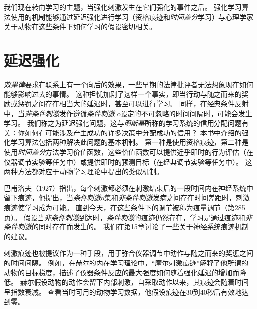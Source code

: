 我们现在转向学习的主题，当强化刺激发生在它们强化的事件之后。
强化学习算法使用的机制能够通过延迟强化进行学习（资格痕迹和\textit{时间差分}学习）与心理学家关于动物在这些条件下如何学习的假设密切相关。


\section{延迟强化} \label{sec:delayed_reinforcement}


\textit{效果律}要求在联系上有一个向后的效果，一些早期的法律批评者无法想象现在如何能够影响过去的事情。
这种担忧加剧了这样一个事实，即当行动与随之而来的奖励或惩罚之间存在相当大的延迟时，甚至可以进行学习。
同样，在经典条件反射中，当\textit{非条件刺激}发作遵循\textit{条件刺激} o设定的不可忽略的时间间隔时，可能会发生学习。
我们称之为延迟强化问题，这与\textit{明斯基}\cite{minsky1961steps}所称的学习系统的信用分配问题有关：你如何在可能涉及产生成功的许多决策中分配成功的信用？
本书中介绍的强化学习算法包括两种解决此问题的基本机制。
第一种是使用资格痕迹，第二种是使用\textit{时间差分}方法学习价值函数，这些价值函数可以提供近乎即时的行为评估（在仪器调节实验等任务中）或提供即时的预测目标（在经典调节实验等任务中）。
这两种方法都对应于动物学习理论中提出的类似机制。


巴甫洛夫（1927）指出，每个刺激都必须在刺激结束后的一段时间内在神经系统中留下痕迹，他提出，当\textit{条件刺激}o集和\textit{非条件刺激}发病之间存在时间差距时，刺激痕迹使学习成为可能。
直到今天，在这些条件下的调节被称为痕量调节（第285页）。
假设当\textit{非条件刺激}到达时，\textit{条件刺激}的痕迹仍然存在，学习是通过痕迹和\textit{非条件刺激}的同时存在而发生的。
我们在第15章讨论了一些关于神经系统痕迹机制的建议。


刺激痕迹也被提议作为一种手段，用于弥合仪器调节中动作与随之而来的奖惩之间的时间间隔。
例如，在赫尔的内在学习理论中，“摩尔刺激痕迹”解释了他所谓的动物的目标梯度，描述了仪器条件反应的最大强度如何随着强化延迟的增加而降低\cite{hull1932goal,hull1943principles}。
赫尔假设动物的动作会留下内部刺激，自采取动作以来，其痕迹会随着时间呈指数衰减。
查看当时可用的动物学习数据，他假设痕迹在30到40秒后有效地达到零。




